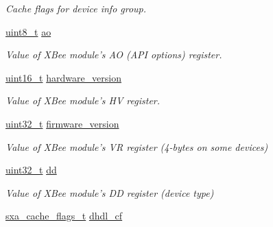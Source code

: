 \begin{DoxyCompactItemize}
\begin{DoxyCompactList}\small\item\em Cache flags for device info group. \end{DoxyCompactList}\item 
\hyperlink{group__hal_gae1affc9ca37cfb624959c866a73f83c2}{uint8\-\_\-t} \hyperlink{structsxa__node__t_a4f850621475e7b60aa5aee84dda81a8f}{ao}
\begin{DoxyCompactList}\small\item\em Value of X\-Bee module's A\-O (A\-P\-I options) register. \end{DoxyCompactList}\item 
\hypertarget{structsxa__node__t_ad4c7c16c071f95965e2e506752b450fe}{\hyperlink{group__hal_ga5a8b2dc9e45a9ee81a94ef304fb62505}{uint16\-\_\-t} \hyperlink{structsxa__node__t_ad4c7c16c071f95965e2e506752b450fe}{hardware\-\_\-version}}\label{structsxa__node__t_ad4c7c16c071f95965e2e506752b450fe}

\begin{DoxyCompactList}\small\item\em Value of X\-Bee module's H\-V register. \end{DoxyCompactList}\item 
\hypertarget{structsxa__node__t_ac8e0f35fdeff288dd1a7b4f49754c9b2}{\hyperlink{group__hal__dos_ga09a1e304d66d35dd47daffee9731edaa}{uint32\-\_\-t} \hyperlink{structsxa__node__t_ac8e0f35fdeff288dd1a7b4f49754c9b2}{firmware\-\_\-version}}\label{structsxa__node__t_ac8e0f35fdeff288dd1a7b4f49754c9b2}

\begin{DoxyCompactList}\small\item\em Value of X\-Bee module's V\-R register (4-\/bytes on some devices) \end{DoxyCompactList}\item 
\hypertarget{structsxa__node__t_a296bccce81453e35d3726ac1476101eb}{\hyperlink{group__hal__dos_ga09a1e304d66d35dd47daffee9731edaa}{uint32\-\_\-t} \hyperlink{structsxa__node__t_a296bccce81453e35d3726ac1476101eb}{dd}}\label{structsxa__node__t_a296bccce81453e35d3726ac1476101eb}

\begin{DoxyCompactList}\small\item\em Value of X\-Bee module's D\-D register (device type) \end{DoxyCompactList}\item 
\hypertarget{structsxa__node__t_adff7949139ea5500a94ee6fbedad3087}{\hyperlink{group___s_x_a_ga21b45e50d83fcc1363c4239313e88c06}{sxa\-\_\-cache\-\_\-flags\-\_\-t} \hyperlink{structsxa__node__t_adff7949139ea5500a94ee6fbedad3087}{dhdl\-\_\-cf}}\label{structsxa__node__t_adff7949139ea5500a94ee6fbedad3087}


\end{DoxyCompactItemize}
